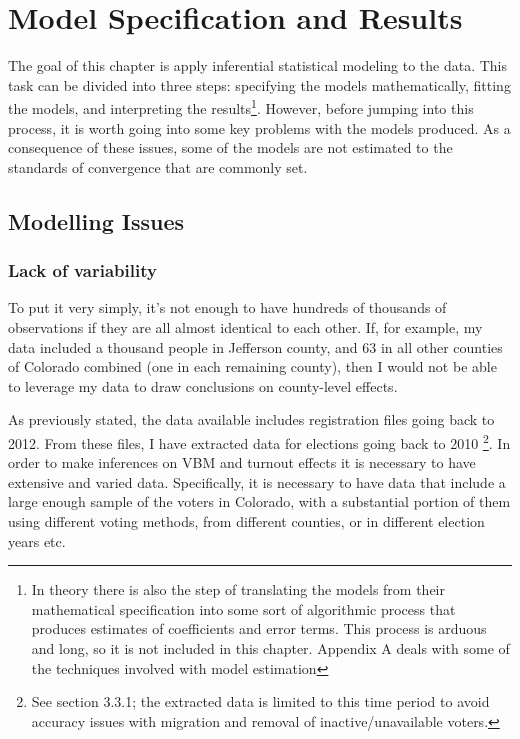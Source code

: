 \documentclass[]{article}
\title{}
\author{}
\date{}
\let\rmarkdownfootnote\footnote%
\def\footnote{\protect\rmarkdownfootnote}
\begin{document}
\section{Model Specification and
Results}\label{model-specification-and-results}

The goal of this chapter is apply inferential statistical modeling to
the data. This task can be divided into three steps: specifying the
models mathematically, fitting the models, and interpreting the
results\footnote{In theory there is also the step of translating the
  models from their mathematical specification into some sort of
  algorithmic process that produces estimates of coefficients and error
  terms. This process is arduous and long, so it is not included in this
  chapter. Appendix A deals with some of the techniques involved with
  model estimation}. However, before jumping into this process, it is
worth going into some key problems with the models produced. As a
consequence of these issues, some of the models are not estimated to the
standards of convergence that are commonly set.

\subsection{Modelling Issues}\label{modelling-issues}

\subsubsection{Lack of variability}\label{lack-of-variability}

To put it very simply, it's not enough to have hundreds of thousands of
observations if they are all almost identical to each other. If, for
example, my data included a thousand people in Jefferson county, and 63
in all other counties of Colorado combined (one in each remaining
county), then I would not be able to leverage my data to draw
conclusions on county-level effects.

As previously stated, the data available includes registration files
going back to 2012. From these files, I have extracted data for
elections going back to 2010 \footnote{See section 3.3.1; the extracted
  data is limited to this time period to avoid accuracy issues with
  migration and removal of inactive/unavailable voters.}. In order to
make inferences on VBM and turnout effects it is necessary to have
extensive and varied data. Specifically, it is necessary to have data
that include a large enough sample of the voters in Colorado, with a
substantial portion of them using different voting methods, from
different counties, or in different election years etc.
\end{document}
